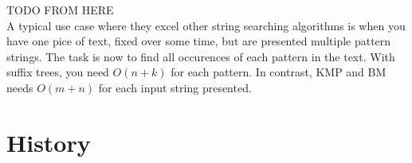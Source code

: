\documentclass[a4paper]{article}
\begin{document}
TODO FROM HERE
\\
A typical use case where they excel other string searching algorithms is when
you have one pice of text, fixed over some time, but are presented multiple
pattern strings. The task is now to find all occurences of each pattern in the
text. With suffix trees, you need $O(n + k)$ for each pattern. In contrast, KMP
and BM needs $O(m + n)$ for each input string presented.

\section{History}

\medskip



\end{document}
